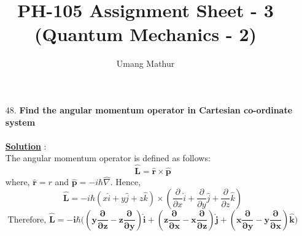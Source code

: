 \documentclass[10pt, a4paper]{article}
\begin{document}
	\title{PH-105 Assignment Sheet - 3 (Quantum Mechanics - 2)}
	\date{}
	\author{Umang Mathur}
	\maketitle
	\begin{enumerate}
		\item[48.] {\bf Find the angular momentum operator in Cartesian co-ordinate system }\\\\
		{\underline {\bf Solution}} :\\
		
		The angular momentum operator is defined as follows:
		\[ \mathbf{\hat{L}} = \mathbf{\hat{r}} \times \mathbf{\hat{p}}\]
		where, $\mathbf{\hat{r}} = r $ and $ \mathbf{\hat{p}} = -i\hbar\hat{\nabla} $. Hence,
		\[\mathbf{\hat{L}} = -i\hbar(x\hat{i} + y\hat{j} + z\hat{k})\times(\frac{\partial}{\partial x}\hat{i} + \frac{\partial}{\partial y}\hat{j} + \frac{\partial}{\partial z}\hat{k})\]
		\[\text{Therefore,  } \mathbf{\hat{L}}= \mathbf{-i\hbar \Big( (y\frac{\partial}{\partial z} - z\frac{\partial}{\partial y})\hat{i} + (z\frac{\partial}{\partial x} - x\frac{\partial}{\partial z})\hat{j} + (x\frac{\partial}{\partial y} - y\frac{\partial}{\partial x})\hat{k} \Big)} \]
	\end{enumerate}
\end{document}
